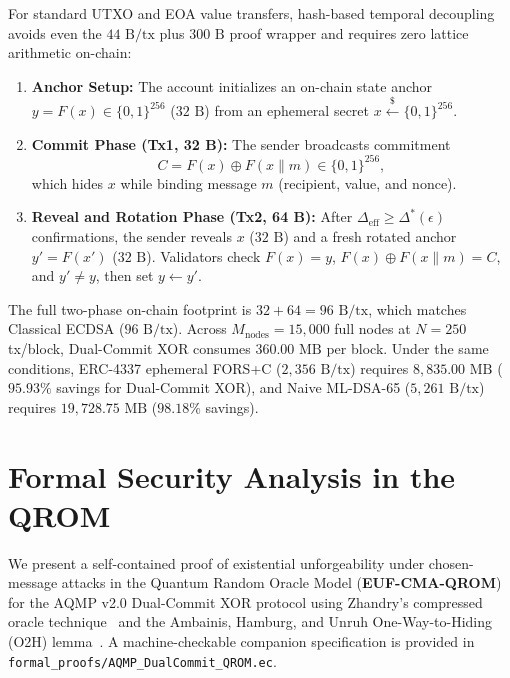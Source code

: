 \documentclass[conference,compsoc]{IEEEtran}
\begin{document}
For standard UTXO and EOA value transfers, hash-based temporal decoupling avoids even the $44\text{ B/tx}$ plus $300\text{ B}$ proof wrapper and requires zero lattice arithmetic on-chain:
\begin{enumerate}
    \item \textbf{Anchor Setup:} The account initializes an on-chain state anchor $y = F(x) \in \{0,1\}^{256}$ ($32\text{ B}$) from an ephemeral secret $x \xleftarrow{\$} \{0,1\}^{256}$.
    \item \textbf{Commit Phase (Tx1, 32 B):} The sender broadcasts commitment
    \begin{equation}
    C = F(x) \oplus F(x \parallel m) \in \{0,1\}^{256},
    \end{equation}
    which hides $x$ while binding message $m$ (recipient, value, and nonce).
    \item \textbf{Reveal and Rotation Phase (Tx2, 64 B):} After $\Delta_{\text{eff}} \ge \Delta^*(\epsilon)$ confirmations, the sender reveals $x$ ($32\text{ B}$) and a fresh rotated anchor $y' = F(x')$ ($32\text{ B}$). Validators check $F(x) = y$, $F(x) \oplus F(x \parallel m) = C$, and $y' \ne y$, then set $y \leftarrow y'$.
\end{enumerate}
The full two-phase on-chain footprint is $32 + 64 = 96\text{ B/tx}$, which matches Classical ECDSA ($96\text{ B/tx}$). Across $M_{\text{nodes}} = 15{,}000$ full nodes at $N = 250$ tx/block, Dual-Commit XOR consumes $360.00\text{ MB}$ per block. Under the same conditions, ERC-4337 ephemeral FORS+C ($2{,}356\text{ B/tx}$) requires $8{,}835.00\text{ MB}$ ($95.93\%$ savings for Dual-Commit XOR), and Naive ML-DSA-65 ($5{,}261\text{ B/tx}$) requires $19{,}728.75\text{ MB}$ ($98.18\%$ savings).

\section{Formal Security Analysis in the QROM}
\label{sec:qrom}

We present a self-contained proof of existential unforgeability under chosen-message attacks in the Quantum Random Oracle Model (\textbf{EUF-CMA-QROM}) for the AQMP v2.0 Dual-Commit XOR protocol using Zhandry's compressed oracle technique~\cite{zhandry2019} and the Ambainis, Hamburg, and Unruh One-Way-to-Hiding (O2H) lemma~\cite{ahu2019}. A machine-checkable companion specification is provided in \texttt{formal\_proofs/\allowbreak AQMP\_DualCommit\_\allowbreak QROM.ec}.
\end{document}
